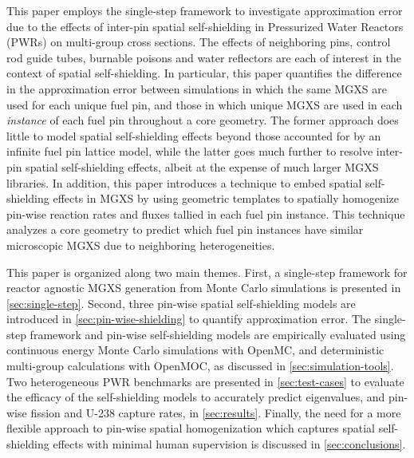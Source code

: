 This paper employs the single-step framework to investigate approximation error due to the effects of inter-pin spatial self-shielding in Pressurized Water Reactors (PWRs) on multi-group cross sections. The effects of neighboring pins, control rod guide tubes, burnable poisons and water reflectors are each of interest in the context of spatial self-shielding. In particular, this paper quantifies the difference in the approximation error between simulations in which the same MGXS are used for each unique fuel pin, and those in which unique MGXS are used in each \textit{instance} of each fuel pin throughout a core geometry. The former approach does little to model spatial self-shielding effects beyond those accounted for by an infinite fuel pin lattice model, while the latter goes much further to resolve inter-pin spatial self-shielding effects, albeit at the expense of much larger MGXS libraries. In addition, this paper introduces a technique to embed spatial self-shielding effects in MGXS by using geometric templates to spatially homogenize pin-wise reaction rates and fluxes tallied in each fuel pin instance. This technique analyzes a core geometry to predict which fuel pin instances have similar microscopic MGXS due to neighboring heterogeneities.

This paper is organized along two main themes. First, a single-step framework for reactor agnostic MGXS generation from Monte Carlo simulations is presented in \autoref{sec:single-step}. Second, three pin-wise spatial self-shielding models are introduced in \autoref{sec:pin-wise-shielding} to quantify approximation error. The single-step framework and pin-wise self-shielding models are empirically evaluated using continuous energy Monte Carlo simulations with OpenMC, and deterministic multi-group calculations with OpenMOC, as discussed in \autoref{sec:simulation-tools}. Two heterogeneous PWR benchmarks are presented in \autoref{sec:test-cases} to evaluate the efficacy of the self-shielding models to accurately predict eigenvalues, and pin-wise fission and U-238 capture rates, in \autoref{sec:results}. Finally, the need for a more flexible approach to pin-wise spatial homogenization which captures spatial self-shielding effects with minimal human supervision is discussed in \autoref{sec:conclusions}.

